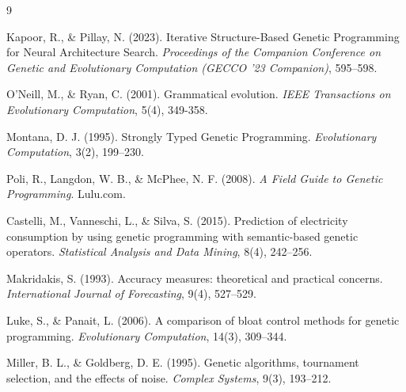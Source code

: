 \documentclass[12pt]{article}
\begin{document}
\begin{thebibliography}{9}

Kapoor, R., \& Pillay, N. (2023). Iterative Structure-Based Genetic Programming for Neural Architecture Search. \textit{Proceedings of the Companion Conference on Genetic and Evolutionary Computation (GECCO '23 Companion)}, 595–598.

O'Neill, M., \& Ryan, C. (2001). Grammatical evolution. \textit{IEEE Transactions on Evolutionary Computation}, 5(4), 349-358.

Montana, D. J. (1995). Strongly Typed Genetic Programming. \textit{Evolutionary Computation}, 3(2), 199–230.

Poli, R., Langdon, W. B., \& McPhee, N. F. (2008). \textit{A Field Guide to Genetic Programming}. Lulu.com.

Castelli, M., Vanneschi, L., \& Silva, S. (2015). Prediction of electricity consumption by using genetic programming with semantic-based genetic operators. \textit{Statistical Analysis and Data Mining}, 8(4), 242–256.

Makridakis, S. (1993). Accuracy measures: theoretical and practical concerns. \textit{International Journal of Forecasting}, 9(4), 527–529.

Luke, S., \& Panait, L. (2006). A comparison of bloat control methods for genetic programming. \textit{Evolutionary Computation}, 14(3), 309–344.

Miller, B. L., \& Goldberg, D. E. (1995). Genetic algorithms, tournament selection, and the effects of noise. \textit{Complex Systems}, 9(3), 193–212.

\end{thebibliography}
\end{document}
